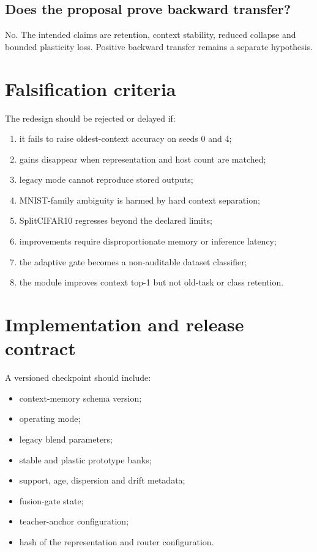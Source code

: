 \documentclass[10pt]{article}
\begin{document}
\subsection*{Does the proposal prove backward transfer?}
No. The intended claims are retention, context stability, reduced collapse and bounded plasticity loss. Positive backward transfer remains a separate hypothesis.

\section{Falsification criteria}
The redesign should be rejected or delayed if:
\begin{enumerate}[leftmargin=*]
\item it fails to raise oldest-context accuracy on seeds 0 and 4;
\item gains disappear when representation and host count are matched;
\item legacy mode cannot reproduce stored outputs;
\item MNIST-family ambiguity is harmed by hard context separation;
\item SplitCIFAR10 regresses beyond the declared limits;
\item improvements require disproportionate memory or inference latency;
\item the adaptive gate becomes a non-auditable dataset classifier;
\item the module improves context top-1 but not old-task or class retention.
\end{enumerate}

\section{Implementation and release contract}
A versioned checkpoint should include:
\begin{itemize}[leftmargin=*]
\item context-memory schema version;
\item operating mode;
\item legacy blend parameters;
\item stable and plastic prototype banks;
\item support, age, dispersion and drift metadata;
\item fusion-gate state;
\item teacher-anchor configuration;
\item hash of the representation and router configuration.
\end{itemize}
\end{document}
